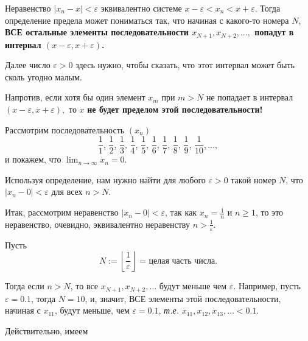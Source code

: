 \begin{comments}
  Неравенство $|x_n-x|<\varepsilon$ эквивалентно системе $x-\varepsilon <x_n < x+ \varepsilon$. Тогда определение предела может пониматься так, что начиная с какого-то номера $N$, \textbf{ВСЕ остальные элементы последовательности $x_{N+1}, x_{N+2}, \ldots,$ попадут в интервал $(x-\varepsilon, x+\varepsilon)$.}
  
  Далее число $\varepsilon>0$ здесь нужно, чтобы сказать, что этот интервал может быть сколь угодно малым.

  Напротив, если хотя бы один элемент $x_m$ при $m>N$ не попадает в интервал $(x-\varepsilon, x+\varepsilon),$ то $x$ \textbf{не будет пределом этой последовательности!}
\end{comments}

\begin{example}
    Рассмотрим последовательность $(x_n)$
    \[
      \frac{1}{1}, \,\frac{1}{2}, \,\frac{1}{3}, \, \frac{1}{4}, \, \frac{1}{5}, \, \frac{1}{6},\, \frac{1}{7},\, \frac{1}{8},\, \frac{1}{9},\, \frac{1}{10},  \ldots,
    \]
  и покажем, что $\lim_{n \to \infty} x_n = 0$.

 Используя определение, нам нужно найти для любого $\varepsilon >0$ такой номер $N$, что $|x_n - 0| < \varepsilon$ для всех $n>N$.

Итак, рассмотрим неравенство $|x_n - 0| < \varepsilon$, так как $x_n = \frac{1}{n}$ и $n\ge 1$, то это неравенство, очевидно, эквивалентно неравенству $n > \frac{1}{\varepsilon}$.

Пусть
\[
 N := \left\lfloor \frac{1}{\varepsilon} \right\rfloor \mbox{ = целая часть числа.}
\]

Тогда если $n>N$, то все $x_{N+1}, x_{N+2}, \ldots $ будут меньше чем $\varepsilon.$ Например, пусть $\varepsilon = 0.1$, тогда $N = 10$, и, значит, ВСЕ элементы этой последовательности, начиная с $x_{11}$, будут меньше, чем $\varepsilon = 0.1$, \textit{т.е.} $x_{11}, x_{12}, x_{13}, \ldots < 0.1$.

Действительно, имеем


\end{example}
